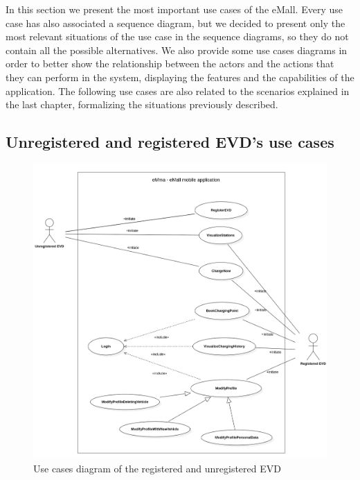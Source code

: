 In this section we present the most important use cases of the eMall. Every use case has also associated a sequence diagram, but we decided to present only the most relevant situations of the use case in the sequence diagrams, so they do not contain all the possible alternatives. We also provide some use cases diagrams in order to better show the relationship between the actors and the actions that they can perform in the system, displaying the features and the capabilities of the application.
The following use cases are also related to the scenarios explained in the last chapter, formalizing the situations previously described. 

\subsection{Unregistered and registered EVD's use cases}
\begin{figure}[H]
    \centering
    \includegraphics[width=1\textwidth]{Images/cp3/UseCaseDiagramEVD.png}
    \caption{Use cases diagram of the registered and unregistered EVD}
\end{figure}

